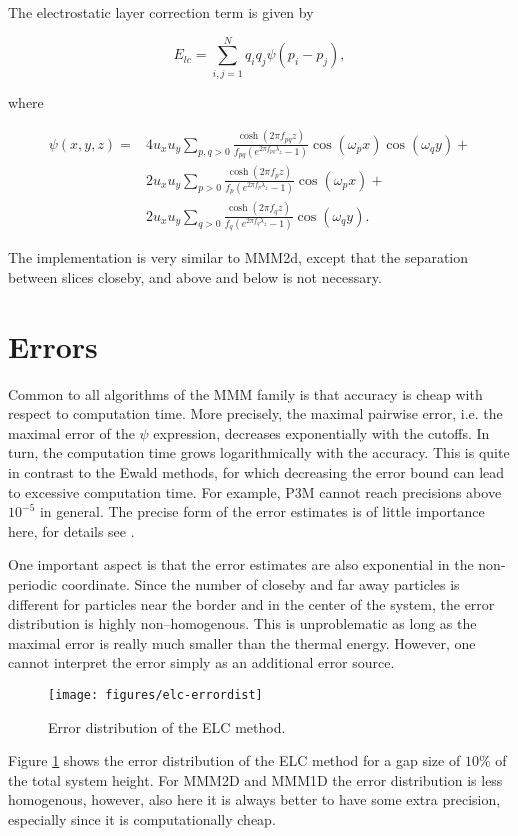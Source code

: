 The electrostatic layer correction term is given by

\[ E_{lc}=\sum_{i,j=1}^Nq_iq_j\psi(p_i-p_j), \]

where

\[ \begin{array}{rl} \psi(x,y,z)=&4u_xu_y\sum_{p,q>0}\frac{\cosh(2\pi
    f_{pq}z)}{f_{pq}(e^{2\pi f_{pq}\lambda_z} - 1)} \cos(\omega_p
  x)\cos(\omega_q y) + \\ &2u_xu_y\sum_{p>0}\frac{\cosh(2\pi f_p
    z)}{f_p(e^{2\pi f_p\lambda_z} - 1)}\cos(\omega_p x)+\\
  &2u_xu_y\sum_{q>0}\frac{\cosh(2\pi f_q z)}{f_q(e^{2\pi f_q\lambda_z}
    - 1)}\cos(\omega_q y). \end{array} \]

The implementation is very similar to MMM2d, except that the
separation between slices closeby, and above and below is not
necessary.

\section{Errors}


Common to all algorithms of the MMM family is that accuracy is cheap
with respect to computation time. More precisely, the maximal pairwise
error, i.e. the maximal error of the $\psi$ expression, decreases
exponentially with the cutoffs. In turn, the computation time grows
logarithmically with the accuracy. This is quite in contrast to the
Ewald methods, for which decreasing the error bound can lead to
excessive computation time. For example, P3M cannot reach precisions
above $10^{-5}$ in general. The precise form of the error estimates is
of little importance here, for details see \citet{elc}.

One important aspect is that the error estimates are also exponential
in the non-periodic coordinate. Since the number of closeby and far
away particles is different for particles near the border and in the
center of the system, the error distribution is highly
non--homogenous. This is unproblematic as long as the maximal error is
really much smaller than the thermal energy. However, one cannot
interpret the error simply as an additional error source.

\begin{figure}[ht]
  \centering
  \texttt{[image: figures/elc-errordist]}
  \caption{Error distribution of the ELC method.}
  \label{fig:ELC-error}
\end{figure}

Figure \ref{fig:ELC-error} shows the error distribution of the ELC
method for a gap size of $10\%$ of the total system height. For MMM2D
and MMM1D the error distribution is less homogenous, however, also
here it is always better to have some extra precision, especially
since it is computationally cheap.



